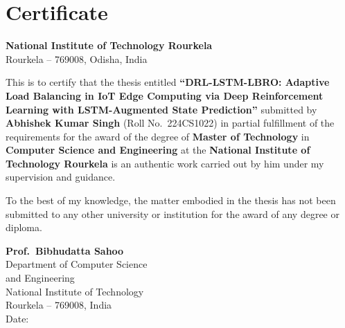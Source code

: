 \chapter*{Certificate}
\thispagestyle{plain}

\begin{center}
{\large\bfseries National Institute of Technology Rourkela}\\[6pt]
{\normalsize Rourkela -- 769008, Odisha, India}
\end{center}

\vspace{1.5cm}

This is to certify that the thesis entitled \textbf{``DRL-LSTM-LBRO:
Adaptive Load Balancing in IoT Edge Computing via Deep Reinforcement
Learning with LSTM-Augmented State Prediction''} submitted by
\textbf{Abhishek Kumar Singh} (Roll No.\ 224CS1022) in partial
fulfillment of the requirements for the award of the degree of
\textbf{Master of Technology} in \textbf{Computer Science and
Engineering} at the \textbf{National Institute of Technology Rourkela}
is an authentic work carried out by him under my supervision and
guidance.

To the best of my knowledge, the matter embodied in the thesis has
not been submitted to any other university or institution for the
award of any degree or diploma.

\vspace{3.0cm}

\noindent
\begin{minipage}[t]{0.55\textwidth}
\end{minipage}
\hfill
\begin{minipage}[t]{0.40\textwidth}
\textbf{Prof.\ Bibhudatta Sahoo}\\
Department of Computer Science\\
and Engineering\\
National Institute of Technology\\
Rourkela -- 769008, India\\[6pt]
Date: \underline{\hspace{3cm}}
\end{minipage}
